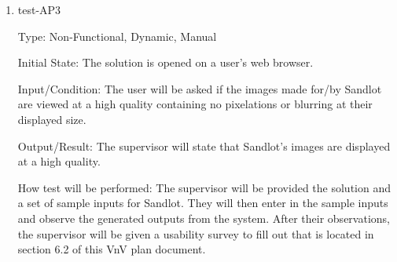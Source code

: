 \documentclass[12pt, titlepage]{article}
\begin{document}
\begin{enumerate}













\item{test-AP3\\}

Type: Non-Functional, Dynamic, Manual

Initial State: The solution is opened on a user's web browser.

Input/Condition: The user will be asked if the images made for/by Sandlot are viewed at
a high quality containing no pixelations or blurring at their displayed size.

Output/Result: The supervisor will state that Sandlot's images are displayed at a high
quality.

How test will be performed: The supervisor will be provided the solution and a set of
sample inputs for Sandlot. They will then enter in the sample inputs and observe the
generated outputs from the system. After their observations, the supervisor will be given
a usability survey to fill out that is located in section 6.2 of this VnV plan document.


\end{enumerate}
\end{document}
